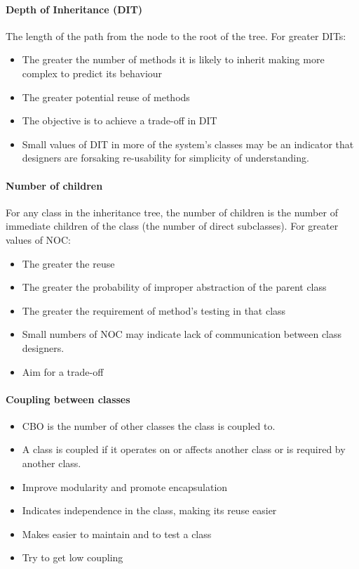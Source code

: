 \paragraph{Depth of Inheritance (DIT)}\label{par:depth_of_inheritance_dit_}

The length of the path from the node to the root of the tree.
For greater DITs:
\begin{itemize}
    \item The greater the number of methods it is likely to inherit making more complex to predict its behaviour
    \item The greater potential reuse of methods
    \item The objective is to achieve a trade-off in DIT
    \item Small values of DIT in more of the system's classes may be an indicator that designers are forsaking re-usability for simplicity of understanding.
\end{itemize}

\paragraph{Number of children}\label{par:number_of_children}

For any class in the inheritance tree, the number of children is the number of immediate children of the class (the number of direct subclasses).
For greater values of NOC:
\begin{itemize}
    \item The greater the reuse
    \item The greater the probability of improper abstraction of the parent class
    \item The greater the requirement of method's testing in that class
    \item Small numbers of NOC may indicate lack of communication between class designers.
    \item Aim for a trade-off
\end{itemize}

\paragraph{Coupling between classes}\label{par:coupling_between_classes}

\begin{itemize}
    \item CBO is the number of other classes the class is coupled to.
    \item A class is coupled if it operates on or affects another class or is required by another class.
    \item Improve modularity and promote encapsulation
    \item Indicates independence in the class, making its reuse easier
    \item Makes easier to maintain and to test a class
    \item Try to get low coupling
\end{itemize}

